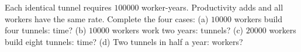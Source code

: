 Each identical tunnel requires $100000$ worker-years. Productivity adds and all workers have the same rate. Complete the four cases: (a) $10000$ workers build four tunnels: time? (b) $10000$ workers work two years: tunnels? (c) $20000$ workers build eight tunnels: time? (d) Two tunnels in half a year: workers?
